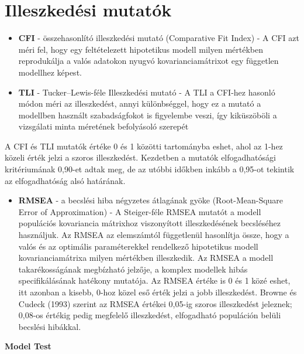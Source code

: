 \documentclass[
  letterpaper,
]{krantz}
\providecommand{\tightlist}{%
  \setlength{\itemsep}{0pt}\setlength{\parskip}{0pt}}\usepackage{longtable,booktabs,array}
\begin{document}
\hypertarget{illeszkeduxe9si-mutatuxf3k}{%
\section{Illeszkedési mutatók}\label{illeszkeduxe9si-mutatuxf3k}}

\begin{itemize}
\item
  \textbf{CFI} - összehasonlító illeszkedési mutató (Comparative Fit
  Index) - A CFI azt méri fel, hogy egy feltételezett hipotetikus modell
  milyen mértékben reprodukálja a valós adatokon nyugvó
  kovarianciamátrixot egy független modellhez képest.
\item
  \textbf{TLI} - Tucker--Lewis-féle Illeszkedési mutató - A TLI a
  CFI-hez hasonló módon méri az illeszkedést, annyi különbséggel, hogy
  ez a mutató a modellben használt szabadságfokot is figyelembe veszi,
  így kiküszöböli a vizsgálati minta méretének befolyásoló szerepét
\end{itemize}

A CFI és TLI mutatók értéke 0 és 1 közötti tartományba eshet, ahol az
1-hez közeli érték jelzi a szoros illeszkedést. Kezdetben a mutatók
elfogadhatósági kritériumának 0,90-et adtak meg, de az utóbbi időkben
inkább a 0,95-ot tekintik az elfogadhatóság alsó határának.

\begin{itemize}
\tightlist
\item
  \textbf{RMSEA} - a becslési hiba négyzetes átlagának gyöke
  (Root-Mean-Square Error of Approximation) - A Steiger-féle RMSEA
  mutatót a modell populációs kovariancia mátrixhoz viszonyított
  illeszkedésének becsléséhez használjuk. Az RMSEA az elemszámtól
  függetlenül hasonlítja össze, hogy a valós és az optimális
  paraméterekkel rendelkező hipotetikus modell kovarianciamátrixa milyen
  mértékben illeszkedik. Az RMSEA a modell takarékosságának megbízható
  jelzője, a komplex modellek hibás specifikálásának hatékony mutatója.
  Az RMSEA értéke is 0 és 1 közé eshet, itt azonban a kisebb, 0-hoz
  közel eső érték jelzi a jobb illeszkedést. Browne és Cudeck (1993)
  szerint az RMSEA értékei 0,05-ig szoros illeszkedést jeleznek; 0,08-os
  értékig pedig megfelelő illeszkedést, elfogadható populáción belüli
  becslési hibákkal.
\end{itemize}

\textbf{Model Test}
\end{document}
